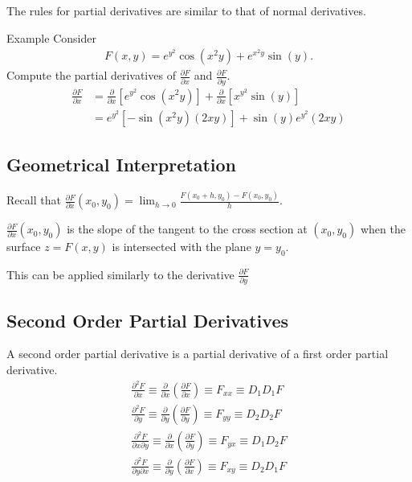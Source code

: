 \documentclass{report}
\begin{document}
			The rules for partial derivatives are similar to that of normal derivatives.

			\begin{question}{Example}
				Consider
					\begin{align*}
						F(x,y) = e^{y^2} \cos(x^2y) + e^{x^2y} \sin(y).
					\end{align*}
				Compute the partial derivatives of $\frac{\partial F}{\partial x}$ and $\frac{\partial F}{\partial y}$.
				\begin{align*}
					\frac{\partial F}{\partial x} &= \frac{\partial}{\partial x} \left[e^{y^2} \cos(x^2y)\right] + \frac{\partial}{\partial x} \left[x^{y^2} \sin(y)\right]	\\
												  &= e^{y^2} \left[-\sin(x^2y) (2xy)\right] + \sin(y) e^{y^2}(2xy)
				\end{align*}
			\end{question}

		\subsection{Geometrical Interpretation}

			Recall that $\frac{\partial F}{\partial x} (x_0, y_0) = \displaystyle\lim_{h\to 0} \frac{F(x_0 + h, y_0) - F(x_0,y_0)}{h}$.

			$\frac{\partial F}{\partial x} (x_0,y_0)$ is the slope of the tangent to the cross section at $(x_0,y_0)$ when the surface $z = F(x,y)$ is intersected with the plane $y = y_0$.

			This can be applied similarly to the derivative $\frac{\partial F}{\partial y}$

		\subsection{Second Order Partial Derivatives}

			A second order partial derivative is a partial derivative of a first order partial derivative.
				\begin{align*}
					\frac{\partial^2 F}{\partial x} \equiv \frac{\partial}{\partial x} (\frac{\partial F}{\partial x}) \equiv F_{xx} \equiv D_1D_1F	\\
					\frac{\partial^2 F}{\partial y} \equiv \frac{\partial}{\partial y} (\frac{\partial F}{\partial y}) \equiv F_{yy} \equiv D_2D_2F	\\
					\frac{\partial^2 F}{\partial x \partial y} \equiv \frac{\partial}{\partial x} (\frac{\partial F}{\partial y}) \equiv F_{yx} \equiv D_1D_2F	\\
					\frac{\partial^2 F}{\partial y \partial x} \equiv \frac{\partial}{\partial y} (\frac{\partial F}{\partial x}) \equiv F_{xy} \equiv D_2D_1F	\\
				\end{align*}
\end{document}

